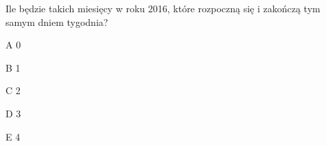 \begin{tresc}
Ile będzie takich miesięcy w roku 2016, które rozpoczną się i zakończą tym samym dniem tygodnia?
\end{tresc}
\begin{wariant}{A} 0 \end{wariant}
\begin{wariant}{B} 1 \end{wariant}
\begin{wariant}{C} 2 \end{wariant}
\begin{wariant}{D} 3 \end{wariant}
\begin{wariant}{E} 4 \end{wariant}
